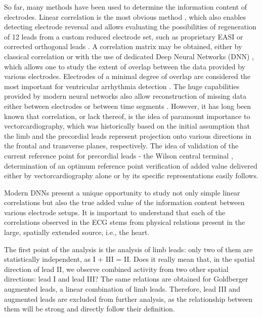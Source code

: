 \documentclass[preprint,12pt]{elsarticle}
\begin{document}
So far, many methods have been used to determine the information content of electrodes. Linear correlation is the most obvious method \cite{Pipberger1961-fi, Holderith2018-ft, Jain2023-rg}, which also enables detecting electrode reversal \cite{Jekova2016-av} and allows evaluating the possibilities of regeneration of 12 leads from a custom reduced electrode set, such as proprietary EASI \cite{Holderith2018-ft} or corrected orthogonal leads \cite{Pipberger1961-fi}. A correlation matrix may be obtained, either by classical correlation \cite{Jain2023-rg} or with the use of dedicated Deep Neural Networks (DNN) \cite{Zhang2022-le}, which allows one to study the extent of overlap between the data provided by various electrodes. Electrodes of a minimal degree of overlap are considered the most important for ventricular arrhythmia detection \cite{Zhang2022-le}. The huge capabilities provided by modern neural networks also allow reconstruction of missing data either between electrodes or between time segments \cite{Lence2024-rb}.
However, it has long been known that correlation, or lack thereof, is the idea of paramount importance to vectorcardiography, which was historically based on the initial assumption that the limb and the precordial leads represent projection onto various directions in the frontal and transverse planes, respectively. The idea of validation of the current reference point for precordial leads - the Wilson central terminal \cite{Gargiulo, Gargiulo2016}, determination of an optimum reference point \cite{Moeinzadeh} verification of added value delivered either by vectorcardiography alone \cite{Man2015} or by its specific representations \cite{Boonstra} easily follows.

Modern DNNs present a unique opportunity to study not only simple linear correlations but also the true added value of the information content between various electrode setups. It is important to understand that each of the correlations observed in the ECG stems from physical relations present in the large, spatially extended source, i.e., the heart.

The first point of the analysis is the analysis of limb leads: only two of them are statistically independent, as I + III = II. Does it really mean that, in the spatial direction of lead II, we observe combined activity from two other spatial directions: lead I and lead III? The same relations are obtained for Goldberger augmented leads, a linear combination of limb leads. Therefore, lead III and augmented leads are excluded from further analysis, as the relationship between them will be strong and directly follow their definition.
\end{document}

